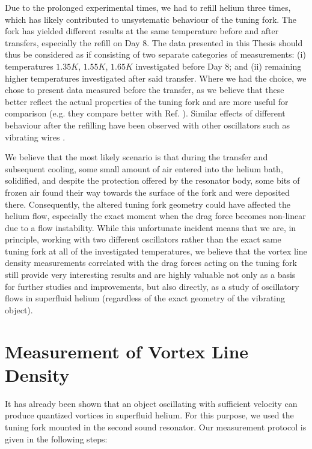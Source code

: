 Due to the prolonged experimental times, we had to refill helium three times, which has likely contributed to unsystematic behaviour of the tuning fork. The fork has yielded different results at the same temperature before and after transfers, especially the refill on Day 8. The data presented in this Thesis should thus be considered as if consisting of two separate categories of measurements: (i) temperatures $ 1.35\unit{K} $, $ 1.55\unit{K} $, $ 1.65\unit{K} $ investigated before Day 8; and (ii) remaining higher temperatures investigated after said transfer. Where we had the choice, we chose to present data measured before the transfer, as we believe that these better reflect the actual properties of the tuning fork and are more useful for comparison (e.g. they compare better with Ref. \cite{lancaster}). Similar effects of different behaviour after the refilling have been observed with other oscillators such as vibrating wires \cite{history}.

We believe that the most likely scenario is that during the transfer and subsequent cooling, some small amount of air entered into the helium bath, solidified, and despite the protection offered by the resonator body, some bits of frozen air found their way towards the surface of the fork and were deposited there. Consequently, the altered tuning fork geometry could have affected the helium flow, especially the exact moment when the drag force becomes non-linear due to a flow instability. While this unfortunate incident means that we are, in principle, working with two different oscillators rather than the exact same tuning fork at all of the investigated temperatures, we believe that the vortex line density measurements correlated with the drag forces acting on the tuning fork still provide very interesting results and are highly valuable not only as a basis for further studies and improvements, but also directly, as a study of oscillatory flows in superfluid helium (regardless of the exact geometry of the vibrating object).


\section{Measurement of Vortex Line Density}

It has already been shown that an object oscillating with sufficient velocity can produce quantized vortices in superfluid helium. For this purpose, we used the tuning fork mounted in the second sound resonator. Our measurement protocol is given in the following steps:

